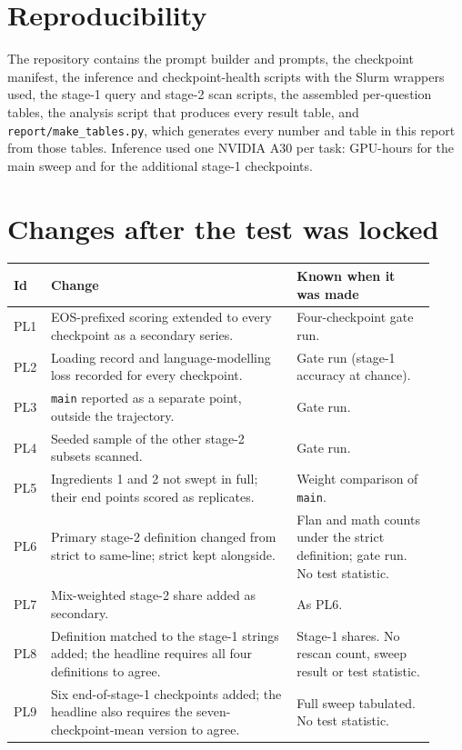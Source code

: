 \documentclass[11pt,a4paper]{article}
\begin{document}
\section{Reproducibility}
The repository contains the prompt builder and prompts, the checkpoint manifest, the inference and checkpoint-health scripts with the Slurm wrappers used, the stage-1 query and stage-2 scan scripts, the assembled per-question tables, the analysis script that produces every result table, and \texttt{report/make\_tables.py}, which generates every number and table in this report from those tables. Inference used one NVIDIA A30 per task: \GpuSweep{} GPU-hours for the main sweep and \GpuTail{} for the additional stage-1 checkpoints.




\appendix
\section{Changes after the test was locked}\label{app:pl}
\begin{longtable}{p{0.06\linewidth}p{0.55\linewidth}p{0.31\linewidth}}
\toprule
Id & Change & Known when it was made \\
\midrule
\endhead
PL1 & EOS-prefixed scoring extended to every checkpoint as a secondary series. & Four-checkpoint gate run. \\
PL2 & Loading record and language-modelling loss recorded for every checkpoint. & Gate run (stage-1 accuracy at chance). \\
PL3 & \texttt{main} reported as a separate point, outside the trajectory. & Gate run. \\
PL4 & Seeded sample of the other stage-2 subsets scanned. & Gate run. \\
PL5 & Ingredients 1 and 2 not swept in full; their end points scored as replicates. & Weight comparison of \texttt{main}. \\
PL6 & Primary stage-2 definition changed from strict to same-line; strict kept alongside. & Flan and math counts under the strict definition; gate run. No test statistic. \\
PL7 & Mix-weighted stage-2 share added as secondary. & As PL6. \\
PL8 & Definition matched to the stage-1 strings added; the headline requires all four definitions to agree. & Stage-1 shares. No rescan count, sweep result or test statistic. \\
PL9 & Six end-of-stage-1 checkpoints added; the headline also requires the seven-checkpoint-mean version to agree. & Full sweep tabulated. No test statistic. \\
\bottomrule
\end{longtable}
\end{document}
